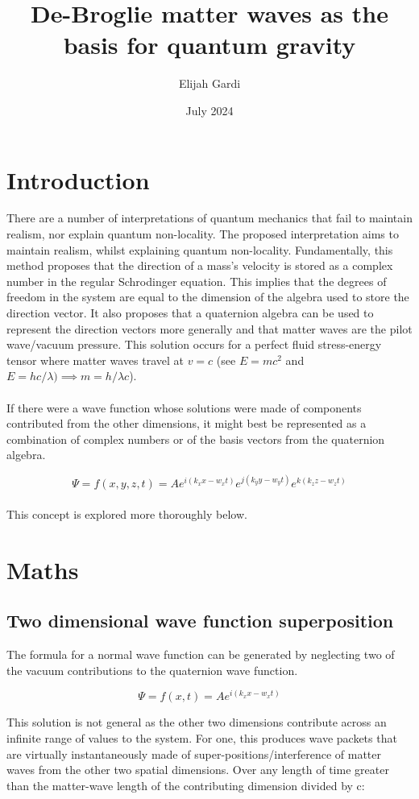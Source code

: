 \documentclass{article}
\title{De-Broglie matter waves as the basis for quantum gravity}
\author{Elijah Gardi}
\date{July 2024}
\begin{document}
\maketitle

\section{Introduction}
There are a number of interpretations of quantum mechanics that fail to maintain realism, nor explain quantum non-locality. The proposed interpretation aims to maintain realism, whilst explaining quantum non-locality. Fundamentally, this method proposes that the direction of a mass's velocity is stored as a complex number in the regular Schrodinger equation. This implies that the degrees of freedom in the system are equal to the dimension of the algebra used to store the direction vector. It also proposes that a quaternion algebra can be used to represent the direction vectors more generally and that matter waves are the pilot wave/vacuum pressure. This solution occurs for a perfect fluid stress-energy tensor where matter waves travel at $v=c$ (see $E=mc^2$ and $E=hc/\lambda) \implies m=h/\lambda c$).\\
\\
If there were a wave function whose solutions were made of components contributed from the other dimensions, it might best be represented as a combination of complex numbers or of the basis vectors from the quaternion algebra.

$$\Psi=f(x,y,z,t)=A e^{i(k_x x-w_x t)} e^{j(k_y y-w_y t)} e^{k(k_z z-w_z t)}$$
\\
This concept is explored more thoroughly below. 
\section{Maths}
\subsection{Two dimensional wave function superposition}

The formula for a normal wave function can be generated by neglecting two of the vacuum contributions to the quaternion wave function.

$$\Psi=f(x,t)=A e^{i(k_x x-w_x t)}$$

This solution is not general as the other two dimensions contribute across an infinite range of values to the system. For one, this produces wave packets that are virtually instantaneously made of super-positions/interference of matter waves from the other two spatial dimensions. Over any length of time greater than the matter-wave length of the contributing dimension divided by c: 
\end{document}
